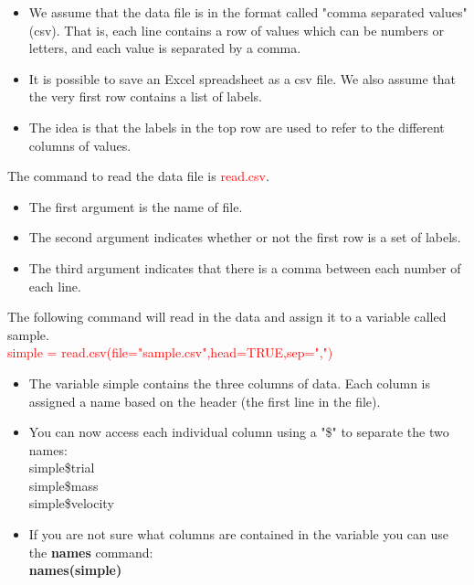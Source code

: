 \documentclass[12pt]{beamer}
\begin{document}
\begin{frame}
\begin{itemize}
	\item We assume that the data file is in the format called "comma
	separated values" (csv). That is, each line contains a row of values
	which can be numbers or letters, and each value is separated by a
	comma.
	\item	It is possible to save an Excel spreadsheet as a csv file.
	We also assume that the very first row contains a list of labels. 
		\item	The	idea is that the labels in the top row are used to refer to the
	different columns of values.
\end{itemize}
\end{frame}

\begin{frame}
The command to read the data file is \textcolor{red}{read.csv}.
\begin{itemize}
	\item The first argument is the name of file.
	\item The second argument indicates whether or not the first row
	is a set of labels.
	\item The third argument indicates that there is a comma between
	each number of each line.
\end{itemize}

The following command will read in the data and assign it to a
variable called sample.\\
\textcolor{red}{simple =
read.csv(file="sample.csv",head=TRUE,sep=",")}
\end{frame}

\begin{frame}
\begin{itemize}\justifying
	\item The variable simple contains the three columns of data. Each
	column is assigned a name based on the header (the first line in
	the file).
	\item You can now access each individual column using a "\$" to
	separate the two names:\\
	simple\$trial\\
	simple\$mass\\
	simple\$velocity
	\item If you are not sure what columns are contained in the variable
	you can use the \textbf{names} command:\\ \textbf{names(simple)}
\end{itemize}
\end{frame}
\end{document}
